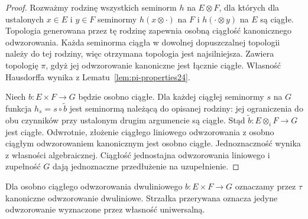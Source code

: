 \begin{proof}
Rozważmy rodzinę wszystkich seminorm $h$ na
$E\otimes F$, dla których dla ustalonych $x\in E$
i $y\in F$ seminormy $h(x\otimes\cdot)$ na $F$
i $h(\cdot\otimes y)$ na $E$ są ciągłe.
Topologia generowana przez tę rodzinę zapewnia
osobną ciągłość kanonicznego odwzorowania.
Każda seminorma ciągła w dowolnej dopuszczalnej
topologii należy do tej rodziny, więc otrzymana
topologia jest najsilniejsza. Zawiera topologię
$\pi$, gdyż jej odwzorowanie kanoniczne jest
łącznie ciągłe. Własność Hausdorffa wynika z
Lematu~\ref{lem:pi-properties24}.

Niech $b:E\times F\to G$ będzie osobno ciągłe.
Dla każdej ciągłej seminormy $s$ na $G$ funkcja
$h_s=s\circ\widetilde b$ jest seminormą należącą
do opisanej rodziny: jej ograniczenia do obu
czynników przy ustalonym drugim argumencie są
ciągłe. Stąd $\widetilde b:E\otimes_i F\to G$
jest ciągłe. Odwrotnie, złożenie ciągłego liniowego
odwzorowania z osobno ciągłym odwzorowaniem
kanonicznym jest osobno ciągłe. Jednoznaczność
wynika z własności algebraicznej. Ciągłość
jednostajna odwzorowania liniowego i zupełność
$G$ dają jednoznaczne przedłużenie na uzupełnienie.
\end{proof}

Dla osobno ciągłego odwzorowania dwuliniowego $b:E\times F\to G$ oznaczamy przez $\tau$ kanoniczne odwzorowanie dwuliniowe. Strzałka przerywana oznacza jedyne odwzorowanie wyznaczone przez własność uniwersalną.
\begin{center}
\end{center}


